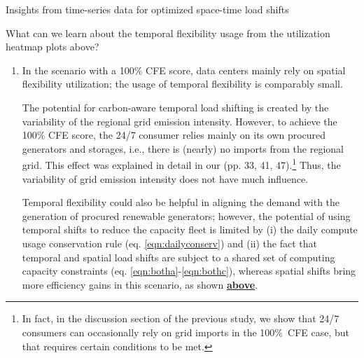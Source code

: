 \begin{frame}{Insights from time-series data for optimized space-time load shifts}

  {\footnotesize 

  What can we learn about the temporal flexibility usage from the utilization heatmap plots above?

  \begin{enumerate}

    \item In the scenario with a 100\% CFE score, data centers mainly rely on spatial flexibility utilization; the usage of temporal flexibility is comparably small.

    \vspace{0.1cm}
    The potential for carbon-aware temporal load shifting is created by the variability of the regional grid emission intensity. However, to achieve the 100\% CFE score, the 24/7 consumer relies mainly on its own procured generators and storages, i.e., there is (nearly) no imports from the regional grid. This effect was explained in detail in our  (pp. 33, 41, 47).\footnote{\scriptsize{In fact, in the discussion section of the previous study, we show that 24/7 consumers can occasionally rely on grid imports in the 100\%~CFE case, but that requires certain conditions to be met.}} Thus, the variability of grid emission intensity does not have much influence.
    
    \vspace{0.1cm} Temporal flexibility could also be helpful in aligning the demand with the generation of procured renewable generators; however, the potential of using temporal shifts to reduce the capacity fleet is limited by (i) the daily compute usage conservation rule (eq. \ref{eqn:dailyconserv}) and (ii) the fact that temporal and spatial load shifts are subject to a shared set of computing capacity constraints (eq. \ref{eqn:botha}-\ref{eqn:bothc}), whereas spatial shifts bring more efficiency gains in this scenario, as shown {\bf \hyperlink{isolated-hook}{above}}.

  \end{enumerate}
  }
\end{frame}



